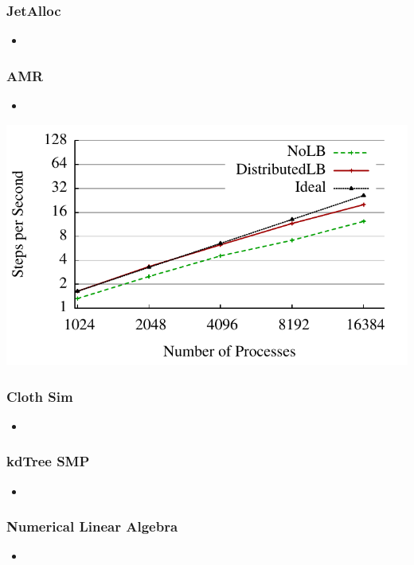 \begin{frame}
\frametitle{JetAlloc}
%
\begin{itemize}
\item
\end{itemize}
%
\end{frame}

\begin{frame}
\frametitle{AMR}
%
\begin{itemize}
\item
\end{itemize}
%
\includegraphics[scale=0.7]{../figures/amr_scaling_distlb.pdf}
\end{frame}

\begin{frame}
\frametitle{Cloth Sim}
%
\begin{itemize}
\item
\end{itemize}
%
\end{frame}

\begin{frame}
\frametitle{kdTree SMP}
%
\begin{itemize}
\item
\end{itemize}
%
\end{frame}

\begin{frame}
\frametitle{Numerical Linear Algebra}
%
\begin{itemize}
\item
\end{itemize}
%
\end{frame}

